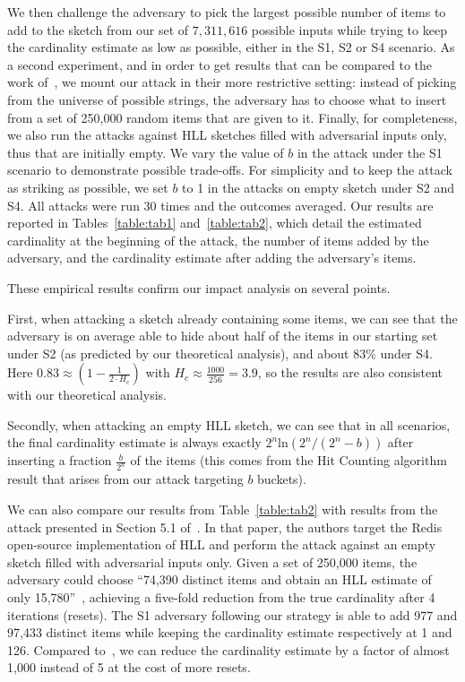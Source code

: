 \documentclass[11pt]{article}
\begin{document}
We then challenge the adversary to pick the largest possible number of items to add to the sketch from our set of  $7,311,616$ possible inputs while trying to keep the cardinality estimate as low as possible, either in the S1, S2 or S4 scenario. As a second experiment, and in order to get results that can be compared to the work of~\cite{hllvuln}, we mount our attack in their more restrictive setting: instead of picking from the universe of possible strings, the adversary has to choose what to insert from a set of 250,000 random items that are given to it. Finally, for completeness, we also run the attacks against HLL sketches filled with adversarial inputs only, thus that are initially empty. We vary the value of $b$ in the attack under the S1 scenario to demonstrate possible trade-offs. For simplicity and to keep the attack as striking as possible, we set $b$ to 1 in the attacks on empty sketch under S2 and S4. All attacks were run 30 times and the outcomes averaged. Our results are reported in Tables~\ref{table:tab1} and~\ref{table:tab2}, which detail the estimated cardinality at the beginning of the attack, the number of items added by the adversary, and the cardinality estimate after adding the adversary's items.

These empirical results confirm our impact analysis on several points.

First, when attacking a sketch already containing some items, we can see that the adversary is on average able to hide about half of the items in our starting set under S2 (as predicted by our theoretical analysis), and about 83\% under S4. %
Here $0.83 \approx (1-\frac{1}{2\cdot H_c})$ with $H_c\approx\frac{1000}{256}=3.9$, so the results are also consistent with our theoretical analysis.

Secondly, when attacking an empty HLL sketch, we can see that in all scenarios, the final cardinality estimate is always exactly $2^n$ln$(2^n/(2^n-b))$ after inserting a fraction $\frac{b}{2^n}$ of the items (this comes from the Hit Counting algorithm result that arises from our attack targeting $b$ buckets).

We can also compare our results from Table~\ref{table:tab2} with results from the attack presented in Section 5.1 of~\cite{hllvuln}. In that paper, the authors target the Redis~\cite{redis} open-source implementation of HLL and perform the attack against an empty sketch filled with adversarial inputs only. Given a set of 250,000 items, the adversary could choose ``74,390 distinct items and obtain an HLL estimate of only 15,780''~\cite{hllvuln}, achieving a five-fold reduction from the true cardinality after 4 iterations (resets). The S1 adversary following our strategy is able to add 977 and 97,433 distinct items while keeping the cardinality estimate respectively at 1 and 126. Compared to~\cite{hllvuln}, we can reduce the cardinality estimate by a factor of almost 1,000 instead of 5 at the cost of more resets.
\end{document}
